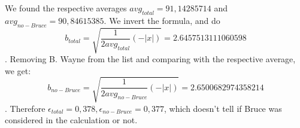 \documentclass[a4paper, 12pt]{article}
\begin{document}
\begin{exercise}
We found the respective averages $avg_{total} = 91,14285714$ and $avg_{no-Bruce}=90,84615385$.
We invert the formula, and do 
\[
	b_{total} = \sqrt{\frac{1}{2 avg_{total}}(-|x|)} = 2.6457513111060598 
\]. 
Removing B. Wayne from the list and comparing with the respective average, we
get:
\[
	b_{no-Bruce} = \sqrt{\frac{1}{2 avg_{no-Bruce}}(-|x|)} = 2.6500682974358214 
\].  
Therefore $\epsilon_{total} = 0,378, \epsilon_{no-Bruce} = 0,377$, which doesn't
tell if Bruce was considered in the calculation or not.  

\end{exercise}


\medskip

\printbibliography

\doclicenseThis
\end{document}

